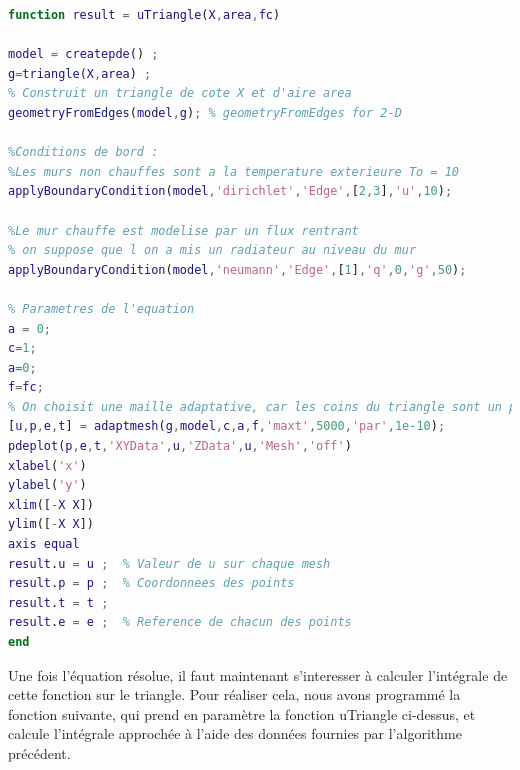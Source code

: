 \documentclass[a4paper,reqno]{article}
\begin{document}
\begin{lstlisting}[language=Matlab,frame=single,caption=Resolution d'une EDP sur un triangle]
function result = uTriangle(X,area,fc)

model = createpde() ; 
g=triangle(X,area) ; 
% Construit un triangle de cote X et d'aire area
geometryFromEdges(model,g); % geometryFromEdges for 2-D

%Conditions de bord : 
%Les murs non chauffes sont a la temperature exterieure To = 10
applyBoundaryCondition(model,'dirichlet','Edge',[2,3],'u',10);

%Le mur chauffe est modelise par un flux rentrant 
% on suppose que l on a mis un radiateur au niveau du mur 
applyBoundaryCondition(model,'neumann','Edge',[1],'q',0,'g',50);

% Parametres de l'equation
a = 0;
c=1;
a=0;
f=fc;
% On choisit une maille adaptative, car les coins du triangle sont un probleme
[u,p,e,t] = adaptmesh(g,model,c,a,f,'maxt',5000,'par',1e-10);
pdeplot(p,e,t,'XYData',u,'ZData',u,'Mesh','off')
xlabel('x')
ylabel('y')
xlim([-X X])
ylim([-X X])
axis equal
result.u = u ;  % Valeur de u sur chaque mesh
result.p = p ;  % Coordonnees des points 
result.t = t ;
result.e = e ;  % Reference de chacun des points 
end
\end{lstlisting}
\vspace{0.5cm}
Une fois l'équation résolue, il faut maintenant s'interesser à calculer l'intégrale de cette fonction sur le triangle. Pour réaliser cela, nous avons programmé la fonction suivante, qui prend en paramètre la fonction uTriangle ci-dessus, et calcule l'intégrale approchée à l'aide des données fournies par l'algorithme précédent.
\end{document}
